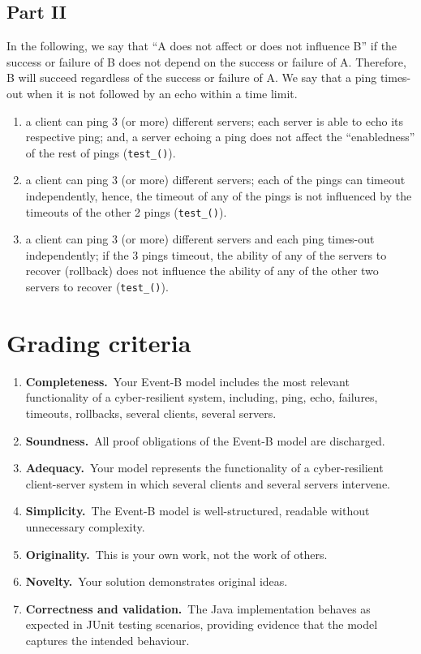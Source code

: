 \documentclass{article} %
\newcommand{\eb}{\textsf{Event-B}\xspace}
\begin{document}
\subsection*{Part II}

In the following, we say that ``A does not affect or does not
influence B'' if the success or failure of B does not depend on the
success or failure of A. Therefore, B will succeed regardless of the
success or failure of A. We say that a ping times-out when it is not
followed by an echo within a time limit.

\begin{enumerate}[leftmargin=*, label=(\textbf{\arabic*})]
\item a client can ping 3 (or more) different servers; each server is able to echo its respective
  ping; and, a server echoing a ping does not affect the ``enabledness'' of the rest of pings
  (\texttt{test\_()}).
\item a client can ping 3 (or more) different servers; each of the pings can timeout independently,
  hence, the timeout of any of the pings is not influenced by the timeouts of the other 2 pings
  (\texttt{test\_()}).
\item a client can ping 3 (or more) different servers and each ping times-out independently; if the
  3 pings timeout, the ability of any of the servers to recover (rollback) does not influence the
  ability of any of the other two servers to recover (\texttt{test\_()}).
\end{enumerate}


\section{Grading criteria}


\begin{enumerate}[leftmargin=*, label=(\textbf{\alph*}), itemsep=-5pt]
\item \textbf{Completeness.}~Your \eb model includes the most relevant functionality of a cyber-resilient system, including, ping, echo, failures, timeouts, rollbacks, several clients, several servers.
  \item \textbf{Soundness.}~All proof obligations of the \eb model are discharged.
  \item \textbf{Adequacy.}~Your model represents the functionality of a cyber-resilient
    client-server system in which several clients and several servers intervene.
  \item \textbf{Simplicity.}~The \eb model is well-structured, readable without unnecessary complexity. 
  \item \textbf{Originality.}~This is your own work, not the work of others. 
  \item \textbf{Novelty.}~Your solution demonstrates original ideas. 
  \item \textbf{Correctness and validation.}~The Java implementation behaves as expected in JUnit testing scenarios, providing evidence that the model captures the intended behaviour.
\end{enumerate}
\end{document}
